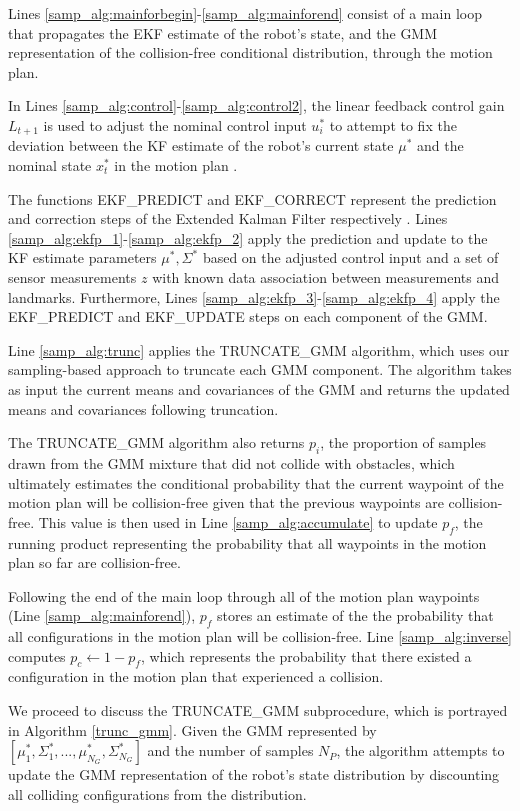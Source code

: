 \documentclass[journal]{IEEEtran}
\begin{document}
Lines \ref{samp_alg:mainforbegin}-\ref{samp_alg:mainforend} consist of a main loop that propagates the EKF estimate of the robot's state, and the GMM representation of the collision-free conditional distribution, through the motion plan.

In Lines \ref{samp_alg:control}-\ref{samp_alg:control2}, the linear feedback control gain $L_{t+1}$ is used to adjust the nominal control input $u_i^*$ to attempt to fix the deviation between the KF estimate of the robot's current state $\mu^*$ and the nominal state $x_t^*$ in the motion plan \cite{IEEEhowto:stengel}. 

The functions EKF\_PREDICT and EKF\_CORRECT represent the prediction and correction steps of the Extended Kalman Filter respectively \cite{IEEEhowto:thrun}. Lines \ref{samp_alg:ekfp_1}-\ref{samp_alg:ekfp_2} apply the prediction and update to the KF estimate parameters $\mu^*,\Sigma^*$ based on the adjusted control input and a set of sensor measurements $z$ with known data association between measurements and landmarks. Furthermore, Lines \ref{samp_alg:ekfp_3}-\ref{samp_alg:ekfp_4} apply the EKF\_PREDICT and EKF\_UPDATE steps on each component of the GMM.

Line \ref{samp_alg:trunc} applies the TRUNCATE\_GMM algorithm, which uses our sampling-based approach to truncate each GMM component. The algorithm takes as input the current means and covariances of the GMM and returns the updated means and covariances following truncation.

The TRUNCATE\_GMM algorithm also returns $p_i$, the proportion of samples drawn from the GMM mixture that did not collide with obstacles, which ultimately estimates the conditional probability that the current waypoint of the motion plan will be collision-free given that the previous waypoints are collision-free. This value is then used in Line \ref{samp_alg:accumulate} to update $p_f$, the running product representing the probability that all waypoints in the motion plan so far are collision-free.

Following the end of the main loop through all of the motion plan waypoints (Line \ref{samp_alg:mainforend}), $p_f$ stores an estimate of the the probability that all configurations in the motion plan will be collision-free. Line \ref{samp_alg:inverse} computes $p_c \gets 1-p_f$, which represents the probability that there existed a configuration in the motion plan that experienced a collision.

We proceed to discuss the TRUNCATE\_GMM subprocedure, which is portrayed in Algorithm \ref{trunc_gmm}. Given the GMM represented by $[\mu_1^*,\Sigma_1^*,...,\mu_{N_G}^*,\Sigma_{N_G}^*]$ and the number of samples $N_P$, the algorithm attempts to update the GMM representation of the robot's state distribution by discounting all colliding configurations from the distribution.
\end{document}
